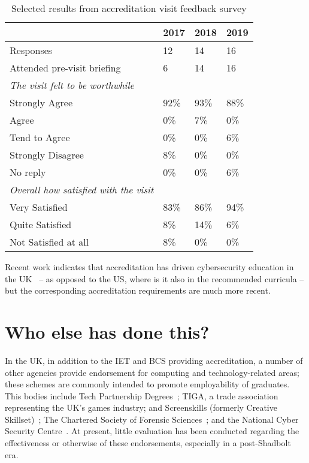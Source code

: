 \documentclass[sigconf]{acmart}
\begin{document}
\begin{table}[h!]
  \caption{Selected results from accreditation visit feedback survey}
  \label{table:1}
\begin{tabular}{ | p{5cm}|p{.75cm}|p{.75cm} |p{.75cm} |}
\hline
 & 2017 & 2018 & 2019   \\ \hline
Responses & 12 & 14 & 16   \\
\hline
Attended pre-visit briefing & 6 & 14 & 16   \\
\hline
{\emph{The visit felt to be worthwhile}} & & &  \\
Strongly Agree &92\% & 93\% &88\% \\
Agree &0\% & 7\% &0\% \\
Tend to Agree &0\% & 0\% &6\% \\
Strongly Disagree &8\% & 0\% &0\% \\
No reply &0\% & 0\% &6\% \\
\hline
{\emph{Overall how satisfied with the visit}} & & &  \\
Very Satisfied &83\% & 86\% &94\% \\
Quite Satisfied &8\% & 14\% &6\% \\
Not Satisfied at all &8\% & 0\% &0\% \\
\hline

\end{tabular}%
\end{table}

Recent work indicates that accreditation has driven cybersecurity
education in the UK~\cite{Cricketal2019} -- as opposed to the US,
where is it also in the recommended curricula -- but the
corresponding accreditation requirements are much more recent.

\section {Who else has done this?}	

In the UK, in addition to the IET and BCS providing accreditation, a
number of other agencies provide endorsement for computing and
technology-related areas; these schemes are commonly intended to
promote employability of graduates. This bodies include Tech
Partnership Degrees~\cite{TP2019}; TIGA, a trade association
representing the UK's games industry; and Screenskills (formerly
Creative Skillset)~\cite{Screenskills2019}; The Chartered Society of
Forensic Sciences~\cite{CSOFS2019}; and the National Cyber Security
Centre~\cite{NCSC2018a}. At present, little evaluation has been
conducted regarding the effectiveness or otherwise of these
endorsements, especially in a post-Shadbolt era.
\end{document}
